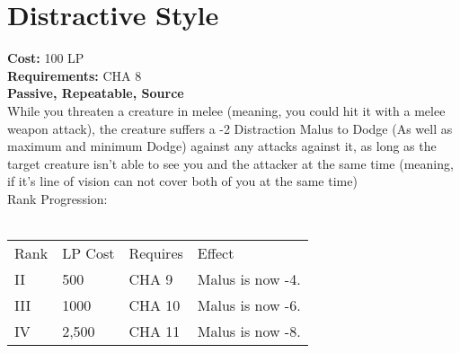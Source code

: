 \section{Distractive Style}\label{perk:distractiveStyle}
\textbf{Cost:} 100 LP\\
\textbf{Requirements:} CHA 8\\
\textbf{Passive, Repeatable, Source}\\
While you threaten a creature in melee (meaning, you could hit it with a melee weapon attack), the creature suffers a -2 Distraction Malus to Dodge (As well as maximum and minimum Dodge) against any attacks against it, as long as the target creature isn't able to see you and the attacker at the same time (meaning, if it's line of vision can not cover both of you at the same time)\\
Rank Progression:\\
\\
\begin{tabular}{l | l | l | l}
    Rank & LP Cost & Requires & Effect\\
    II & 500 & CHA 9 & Malus is now -4.\\
    III & 1000 & CHA 10 &  Malus is now -6.\\
    IV & 2,500 & CHA 11 &  Malus is now -8.\\
\end{tabular}